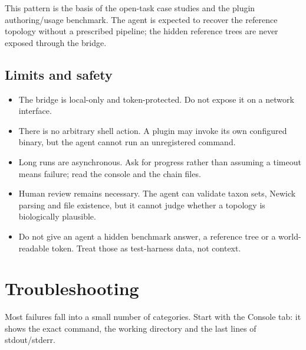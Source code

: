 \documentclass[10pt]{report}
\begin{document}
This pattern is the basis of the open-task case studies and the plugin
authoring/usage benchmark. The agent is expected to recover the reference
topology without a prescribed pipeline; the hidden reference trees are never
exposed through the bridge.

\section{Limits and safety}

\begin{itemize}
  \item The bridge is local-only and token-protected. Do not expose it on a
        network interface.
  \item There is no arbitrary shell action. A plugin may invoke its own
        configured binary, but the agent cannot run an unregistered command.
  \item Long runs are asynchronous. Ask for progress rather than assuming a
        timeout means failure; read the console and the chain files.
  \item Human review remains necessary. The agent can validate taxon sets,
        Newick parsing and file existence, but it cannot judge whether a
        topology is biologically plausible.
  \item Do not give an agent a hidden benchmark answer, a reference tree or a
        world-readable token. Treat those as test-harness data, not context.
\end{itemize}

\chapter{Troubleshooting}\label{ch:troubleshooting}

Most failures fall into a small number of categories. Start with the Console
tab: it shows the exact command, the working directory and the last lines of
stdout/stderr.
\end{document}
